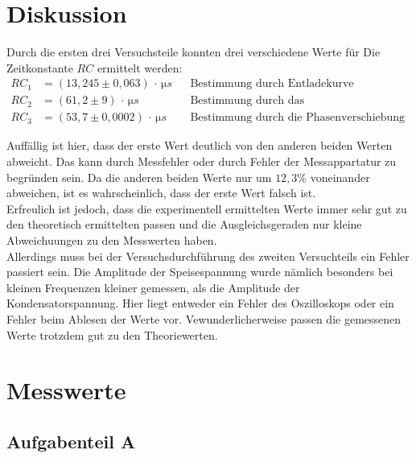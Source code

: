 \section{Diskussion}
\label{sec:Diskussion}

Durch die ersten drei Versuchsteile konnten drei verschiedene Werte für Die Zeitkonstante
$RC$ ermittelt werden: \\
\begin{align*}
    RC_1 &= (13{,}245 \pm 0{,}063) \, \cdot \, \si{\micro s} &
	     &\text{Bestimmung durch Entladekurve}
	\\
	RC_2 &= (61,2 \pm 9)  \, \cdot \, \si{\micro s} &
	     &\text{Bestimmung durch das Amplitudenverhältnis}
	\\
	RC_3 &= (53,7 \pm 0,0002) \, \cdot \, \si{\micro s} &
	     &\text{Bestimmung durch die Phasenverschiebung}
\end{align*}

Auffällig ist hier, dass der erste Wert deutlich von den anderen beiden Werten abweicht. Das kann durch Messfehler
oder durch Fehler der Messappartatur zu begründen sein. Da die anderen beiden Werte nur um $12,3 \%$ voneinander abweichen,
ist es wahrscheinlich, dass der erste Wert falsch ist.\\
Erfreulich ist jedoch, dass die experimentell ermittelten Werte immer sehr gut zu den theoretisch ermittelten 
passen und die Ausgleichsgeraden nur kleine Abweichuungen zu den Messwerten haben.\\
Allerdings muss bei der Versuchsdurchführung des zweiten Versuchteils ein Fehler passiert sein. Die Amplitude
der Speisespannung wurde nämlich besonders bei kleinen Frequenzen kleiner gemessen, als die Amplitude der 
Kondensatorspannung. Hier liegt entweder ein Fehler des Oszilloskops oder ein Fehler beim Ablesen der Werte vor.
Vewunderlicherweise passen die gemessenen Werte trotzdem gut zu den Theoriewerten.

\newpage 

\section{Messwerte}
\label{sec:Messwerte}

\subsection{Aufgabenteil A}

